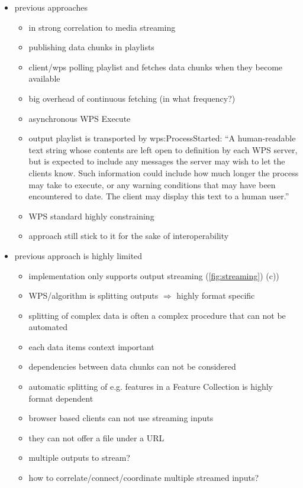 \begin{itemize}
		\item previous approaches \citep{foerster2012live}
		\begin{itemize}
			\item in strong correlation to media streaming \citep{ietf:draft-pantos-http-live-streaming-12}
			\item publishing data chunks in playlists
			\item client/wps polling playlist and fetches data chunks when they become available
			\item big overhead of continuous fetching (in what frequency?)
			\item asynchronous WPS Execute
			\item output playlist is transported by wps:ProcessStarted: ``A human-readable text string whose contents are left open to definition by each WPS server, but is expected to include any messages the server may wish to let the clients know. Such information could include how much longer the process may take to execute, or any warning conditions that may have been encountered to date. The client may display this text to a human user.''
			\item WPS standard highly constraining
			\item approach still stick to it for the sake of interoperability
		\end{itemize}
		\item previous approach is highly limited
		\begin{itemize}
			\item implementation only supports output streaming (\ref{fig:streaming}) (c))
			\item WPS/algorithm is splitting outputs $\Rightarrow$ highly format specific
			\item splitting of complex data is often a complex procedure that can not be automated
			\item each data items context important
			\item dependencies between data chunks can not be considered
			\item automatic splitting of e.g. features in a Feature Collection is highly format dependent
			\item browser based clients can not use streaming inputs
			\item they can not offer a file under a URL
			\item multiple outputs to stream?
			\item how to correlate/connect/coordinate multiple streamed inputs?

\end{itemize}
\end{itemize}
